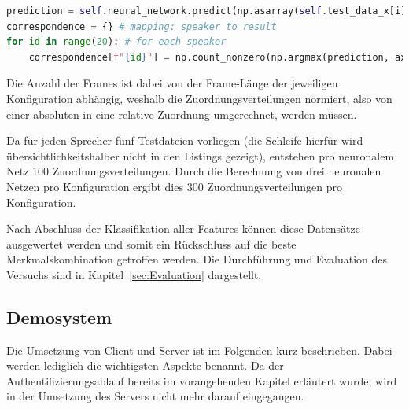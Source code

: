 \begin{lstlisting}[language=Python,numbers=none,caption=Evaluation mit model.predict und Normalisierung des Ergebnisses,label=lst-model-predict]
prediction = self.neural_network.predict(np.asarray(self.test_data_x[i])) # generate prediction for the sample
correspondence = {} # mapping: speaker to result
for id in range(20): # for each speaker
    correspondence[f"{id}"] = np.count_nonzero(np.argmax(prediction, axis=1) == id) / len(prediction) # normalization
\end{lstlisting}

Die Anzahl der Frames ist dabei von der Frame-Länge der jeweiligen Konfiguration abhängig, weshalb die Zuordnungsverteilungen normiert, also von einer absoluten in eine relative Zuordnung umgerechnet, werden müssen.

Da für jeden Sprecher fünf Testdateien vorliegen (die Schleife hierfür wird übersichtlichkeitshalber nicht in den Listings gezeigt), entstehen pro neuronalem Netz 100 Zuordnungsverteilungen.
Durch die Berechnung von drei neuronalen Netzen pro Konfiguration ergibt dies 300 Zuordnungsverteilungen pro Konfiguration.

Nach Abschluss der Klassifikation aller Features können diese Datensätze ausgewertet werden und somit ein Rückschluss auf die beste Merkmalskombination getroffen werden.
Die Durchführung und Evaluation des Versuchs sind in Kapitel~\ref{sec:Evaluation} dargestellt.

\subsection{Demosystem}
Die Umsetzung von Client und Server ist im Folgenden kurz beschrieben.
Dabei werden lediglich die wichtigsten Aspekte benannt.
Da der Authentifizierungsablauf bereits im vorangehenden Kapitel erläutert wurde, wird in der Umsetzung des Servers nicht mehr darauf eingegangen.

